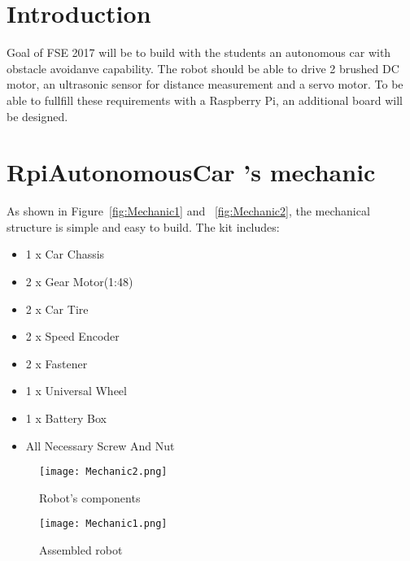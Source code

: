 \documentclass[
12pt, %
a4paper, %
oneside, %
headinclude,footinclude, %
BCOR5mm, %
]{scrartcl}
\begin{document}
%
\newpage
%


\section{Introduction}
Goal of FSE 2017 will be to build with the students an autonomous car with obstacle avoidanve capability. The robot should be able to drive 2 brushed DC motor, an ultrasonic sensor for distance measurement and a servo motor. To be able to fullfill these requirements with a Raspberry Pi, an additional board will be designed.


\section{RpiAutonomousCar 's mechanic}
As shown in Figure~\vref{fig:Mechanic1} and ~\vref{fig:Mechanic2}, the mechanical structure is simple and easy to build. The kit includes:
\begin{itemize}
\item 1 x Car Chassis 
\item 2 x Gear Motor(1:48) 
\item 2 x Car Tire 
\item 2 x Speed Encoder 
\item 2 x Fastener 
\item 1 x Universal Wheel 
\item 1 x Battery Box 
\item All Necessary Screw And Nut
\end{itemize}

\begin{figure}[!htb]
  \texttt{[image: Mechanic2.png]}
  \caption{Robot's components}\label{fig:Mechanic2}
\endminipage\hfill
{}
  \texttt{[image: Mechanic1.png]}
  \caption{Assembled robot}\label{fig:Mechanic1}
\endminipage
\end{figure}


\end{document}
